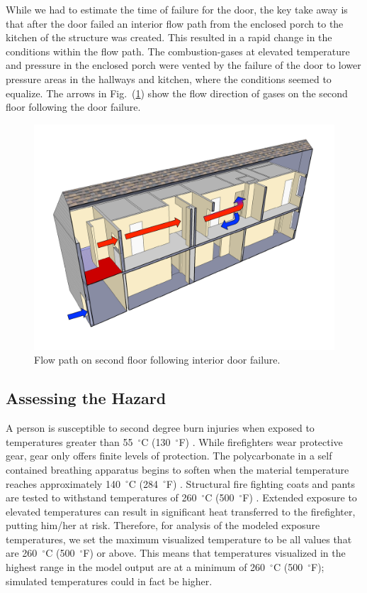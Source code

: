\documentclass[11pt,oneside]{book}
\begin{document}
While we had to estimate the time of failure for the door, the key take away is that after the door failed an interior flow path from the enclosed porch to the kitchen of the structure was created. This resulted in a rapid change in the conditions within the flow path. The combustion-gases at elevated temperature and pressure in the enclosed porch were vented by the failure of the door to lower pressure areas in the hallways and kitchen, where the conditions seemed to equalize. The arrows in Fig.~(\ref{fig:flowpath_1}) show the flow direction of gases on the second floor following the door failure.

\begin{figure}[h!]
\centering
\includegraphics[width=.7\textwidth]{../Figures/ChicagoFlow}
\caption{Flow path on second floor following interior door failure.}
\label{fig:flowpath_1}
\end{figure}

\subsection{Assessing the Hazard}

A person is susceptible to second degree burn injuries when exposed to temperatures greater than 55~$^{\circ}$C (130~$^{\circ}$F) \cite{designation2003c}. While firefighters wear protective gear, gear only offers finite levels of protection. The polycarbonate in a self contained breathing apparatus begins to soften when the material temperature reaches approximately 140~$^{\circ}$C (284~$^{\circ}$F) \cite{mensch2011emergency}. Structural fire fighting coats and pants are tested to withstand temperatures of 260~$^{\circ}$C (500~$^{\circ}$F) \cite{nfpa2013standard}. Extended exposure to elevated temperatures can result in significant heat transferred to the firefighter, putting him/her at risk. Therefore, for analysis of the modeled exposure temperatures, we set the maximum visualized temperature to be all values that are 260~$^{\circ}$C (500~$^{\circ}$F) or above. This means that temperatures visualized in the highest range in the model output are at a minimum of 260~$^{\circ}$C (500~$^{\circ}$F); simulated temperatures could in fact be higher.
\end{document}
